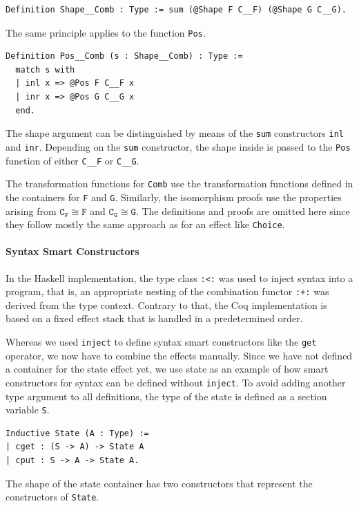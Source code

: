 \documentclass[a4paper, 11pt, fleqn, twoside, abstract=on]{scrreprt}
\newcommand{\todo}[1]{\marginpar{\textbf{TODO:} #1}}
\newcommand{\hinl}[1]{\texttt{#1}}
\newcommand{\cinl}[1]{\texttt{#1}}
\begin{document}
\begin{verbatim}
Definition Shape__Comb : Type := sum (@Shape F C__F) (@Shape G C__G).
\end{verbatim}
\noindent
The same principle applies to the function \cinl{Pos}.

\begin{verbatim}
Definition Pos__Comb (s : Shape__Comb) : Type :=
  match s with
  | inl x => @Pos F C__F x
  | inr x => @Pos G C__G x
  end.
\end{verbatim}
\noindent
The shape argument can be distinguished by means of the \cinl{sum} constructors \cinl{inl} and \cinl{inr}.
Depending on the \cinl{sum} constructor, the shape inside is passed to the \cinl{Pos} function of either \cinl{C__F} or \cinl{C__G}.

The transformation functions for \cinl{Comb} use the transformation functions defined in the containers for \cinl{F} and \cinl{G}.
Similarly, the isomorphism proofs use the properties arising from $\texttt{C}_\texttt{F} \cong \texttt{F}$ and $\texttt{C}_\texttt{G} \cong \texttt{G}$.
The definitions and proofs are omitted here since they follow mostly the same approach as for an effect like \cinl{Choice}.
\todo{Appendix?}

\paragraph{Syntax Smart Constructors}

In the Haskell implementation, the type class \hinl{:<:} was used to inject syntax into a program, that is, an appropriate nesting of the combination functor \hinl{:+:} was derived from the type context.
Contrary to that, the Coq implementation is based on a fixed effect stack that is handled in a predetermined order.

Whereas we used \hinl{inject} to define syntax smart constructors like the \hinl{get} operator, we now have to combine the effects manually.
Since we have not defined a container for the state effect yet, we use state as an example of how smart constructors for syntax can be defined without \hinl{inject}.
To avoid adding another type argument to all definitions, the type of the state is defined as a section variable \cinl{S}.

\begin{verbatim}
Inductive State (A : Type) :=
| cget : (S -> A) -> State A
| cput : S -> A -> State A.
\end{verbatim}
\noindent
The shape of the state container has two constructors that represent the constructors of \cinl{State}.
\end{document}
